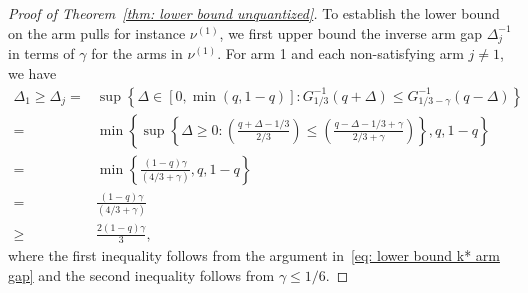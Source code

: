 \begin{proof}[Proof of Theorem~\ref{thm: lower bound unquantized}]
To establish the lower bound on the arm pulls for instance $\nu^{(1)}$, we  first upper bound the inverse arm gap $\Delta_j^{-1}$ in terms of $\gamma$ for the arms in $\nu^{(1)}$. For arm 1 and each non-satisfying arm $j \ne 1$, we have
\begin{align}
    \Delta_1 \ge    
    \Delta_j=&\sup
    \left\{
        \Delta \in \left[0, \min(q, 1-q) \right]
        \colon
        G^{-1}_{1/3}(q + \Delta) 
        \le
        G^{-1}_{1/3-\gamma}(q - \Delta) 
        \right\} 
         \label{eq: gap g_gamma first line}
        \\
    =&
    \min\left\{
    \sup
    \left\{
        \Delta \ge 0
        \colon
         \left(\frac{q  +  \Delta  - 1/3}{2/3} \right)
         \le
         \left(\frac{q  - \Delta  - 1/3 +\gamma }{2/3+\gamma }\right)  
        \right\} , 
         q, 1-q
        \right\} \\
      =&   
      \min\left\{\frac{ (1-q)\gamma}
      {(4/3 + \gamma )}, q, 1-q \right\} 
       \label{eq: gap g_gamma last line} \\
      =&   
     \frac{ (1-q)\gamma}
      {(4/3 + \gamma )} \\
    \ge&
    \frac{2(1-q)\gamma}{3},
    \label{eq: delta_k gamma}
\end{align}
where the first inequality follows from the argument in~\eqref{eq: lower bound k* arm gap} and the second inequality follows from $\gamma \le 1/6$. 



\end{proof}
